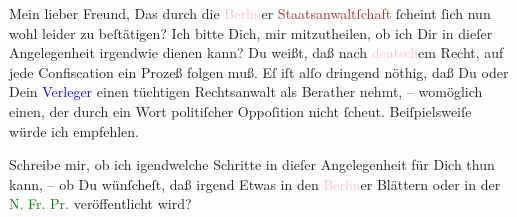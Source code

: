 \pstart\center{}Mein lieber Freund,\pend
\pstart
           Das \label{K_L03441-1v}\label{K_L03441-1h} durch die \textcolor{pink}{Berlin}{}\ledrightnote{\textcolor{pink}{Berlin}}er \textcolor{brown}{Staatsanwaltſchaft}{}\ledrightnote{\textcolor{brown}{Staatsanwaltschaft Berlin}} ſcheint ſich nun wohl leider zu
               beſtätigen? Ich bitte Dich, mir mitzutheilen, ob ich Dir in dieſer Angelegenheit
               irgendwie  dienen kann? Du weißt, daß nach \textcolor{pink}{deutsch}{}\ledrightnote{{$\rightarrow$}\textcolor{pink}{Deutschland}}em Recht, auf jede
               Confiscation ein Prozeß folgen muß. Eſ iſt alſo dringend nöthig, daß Du oder Dein \textcolor{brown}{\textcolor{blue}{Verleger}{}\ledrightnote{\textcolor{blue}{Fritz Freund}}}{}\ledrightnote{\textcolor{brown}{Wiener Verlag}} einen tüchtigen Rechtsanwalt  als Berather
               nehmt, – womöglich einen, der durch ein {\pb}Wort
               politiſcher Oppoſition nicht ſcheut. Beiſpielsweiſe würde ich \label{K_L03441-11v}\label{K_L03441-11h} empfehlen.\pend
           
\pstart
           Schreibe mir, ob ich igendwelche Schritte in dieſer Angelegenheit für Dich thun kann,
               – ob Du wünſcheſt, daß irgend Etwas in den \textcolor{pink}{Berlin}{}\ledrightnote{\textcolor{pink}{Berlin}}er Blättern oder in der \textcolor{green}{N. Fr. Pr.}{}\ledrightnote{\textcolor{green}{Neue Freie Presse}}
               veröffentlicht wird?\pend
           
